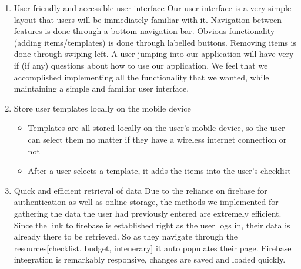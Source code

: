 \documentclass[12pt]{article}
\begin{document}
	\begin{enumerate}
		\item{User-friendly and accessible user interface}
		Our user interface is a very simple layout that users will be immediately familiar with it. Navigation between features is done through a bottom navigation bar.
		Obvious functionality (adding items/templates) is done through labelled buttons. Removing items is done through swiping left.
		A user jumping into our application will have very if (if any) questions about how to use our application.
		We feel that we accomplished implementing all the functionality that we wanted, while maintaining a simple and familiar user interface.

		\item{Store user templates locally on the mobile device}
		\begin{itemize}
			\item Templates are all stored locally on the user's mobile device, so the user can select them no matter if they have a wireless internet connection or not
			\item After a user selects a template, it adds the items into the user's checklist
		\end{itemize}

		\item{Quick and efficient retrieval of data}
		Due to the reliance on firebase for authentication as well as online storage, the methods we implemented for gathering the data the user had previously entered
		are extremely efficient.
		Since the link to firebase is established right as the user logs in, their data is already there to be retrieved.
		So as they navigate through the resources[checklist, budget, intenerary] it auto populates their page.
			Firebase integration is remarkably responsive, changes are saved and loaded quickly.
	\end{enumerate}

	\pagebreak
\end{document}
